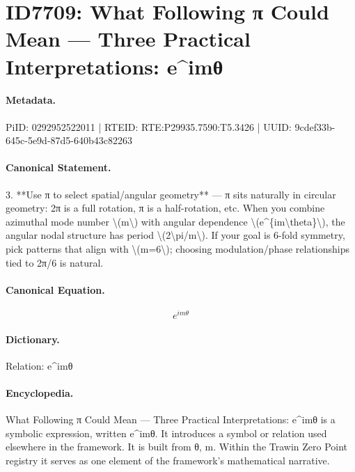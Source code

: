 \section*{ID7709: What Following π Could Mean — Three Practical Interpretations: e\textasciicircum{}imθ}
\paragraph{Metadata.}
PiID: 0292952522011 | RTEID: RTE:P29935.7590:T5.3426 | UUID: 9cdef33b-645c-5e9d-87d5-640b43c82263

\paragraph{Canonical Statement.}
3. **Use π to select spatial/angular geometry** — π sits naturally in circular geometry: 2π is a full rotation, π is a half-rotation, etc. When you combine azimuthal mode number \textbackslash{}(m\textbackslash{}) with angular dependence \textbackslash{}(e\textasciicircum{}\{im\textbackslash{}theta\}\textbackslash{}), the angular nodal structure has period \textbackslash{}(2\textbackslash{}pi/m\textbackslash{}). If your goal is 6-fold symmetry, pick patterns that align with \textbackslash{}(m=6\textbackslash{}); choosing modulation/phase relationships tied to 2π/6 is natural.

\paragraph{Canonical Equation.}
\[
e^{im\theta}
\]

\paragraph{Dictionary.}
Relation: e\textasciicircum{}imθ

\paragraph{Encyclopedia.}
What Following π Could Mean — Three Practical Interpretations: e\textasciicircum{}imθ is a symbolic expression, written e\textasciicircum{}imθ. It introduces a symbol or relation used elsewhere in the framework. It is built from θ, m. Within the Trawin Zero Point registry it serves as one element of the framework's mathematical narrative.
